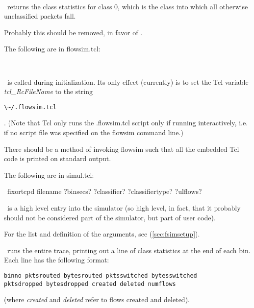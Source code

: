 \documentclass{article}
\begin{document}
\SYNOPSIS \cmdname\

\DESCRIPTION

\cmdname\ returns the class statistics for class 0, which is the class
into which all otherwise unclassified packets fall.

\BUGS

Probably this should be removed, in favor of
.

\SEEALSO


\manend

The following are in flowsim.tcl:


\SYNOPSIS \cmdname\

\DESCRIPTION

\cmdname\ is called during initialization.  Its only effect (currently)
is to set the Tcl variable \emph{tcl\_RcFileName} to the string
\begin{verbatim}\~/.flowsim.tcl\end{verbatim}.  (Note that Tcl only
runs the .flowsim.tcl script only if running interactively, i.e.
if no script file was specified on the flowsim command line.)

\BUGS

There should be a method of invoking flowsim such that all the embedded
Tcl code is printed on standard output.

\manend

The following are in simul.tcl:


\SYNOPSIS \cmdname\ fixortcpd filename ?binsecs? ?classifier?
?classifiertype? ?ulflows?

\cmdname\ is a high level entry into the simulator (so high level, in
fact, that it probably should not be considered part of the simulator,
but part of user code).

For the list and definition of the arguments, see 
(\ref{sec:fsimsetup}).

\cmdname\ runs the entire trace, printing out a line of class
statistics at the end of each bin.  Each line has the following format:
\begin{verbatim}
binno pktsrouted bytesrouted pktsswitched bytesswitched
pktsdropped bytesdropped created deleted numflows
\end{verbatim}
(where \emph{created} and \emph{deleted} refer to flows created and
deleted).
\end{document}
